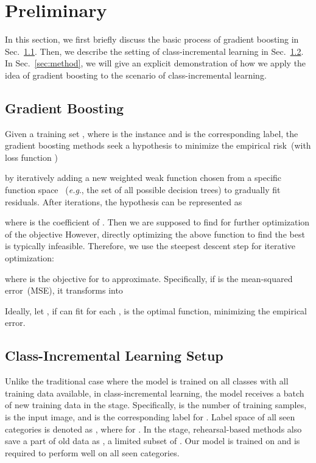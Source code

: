 \documentclass[runningheads]{llncs}
\begin{document}
\section{Preliminary}
In this section, we first briefly discuss the basic process of gradient boosting in Sec.~\ref{sec:GB}. Then, we describe the setting of class-incremental learning in Sec.~\ref{sec:setup}.  In Sec.~\ref{sec:method}, we will give an explicit demonstration of how we apply the idea of gradient boosting to the scenario of class-incremental learning.

\subsection{Gradient Boosting}\label{sec:GB}

Given a training set , where  is the instance and  is the corresponding label, the gradient boosting methods seek a hypothesis  to minimize the empirical risk~(with loss function )

by iteratively adding a new weighted weak function  chosen from a specific function space ~(\textit{e.g}., the set of all possible decision trees) to gradually fit residuals. After  iterations, the hypothesis  can be represented as 

where  is the coefficient of . Then we are supposed to find  for further optimization of the objective 
However, directly optimizing the above function to find the best  is typically infeasible. Therefore, we use the steepest descent step for iterative optimization:

where  is the objective for  to approximate. Specifically, if  is the mean-squared error~(MSE), it transforms into

Ideally, let , if  can fit  for each ,   is the optimal function, minimizing the empirical error.  
\subsection{Class-Incremental Learning Setup }\label{sec:setup}
Unlike the traditional case where the model is trained on all classes with all training data available, in class-incremental learning, the model receives a batch of new training data  in the  stage. Specifically,  is the number of training samples,  is the input image, and  is the corresponding label for . Label space of all seen categories is denoted as , where  for . In the  stage, rehearsal-based methods also save a part of old data as , a limited subset of . Our model is trained on  and is required to perform well on all seen categories. 
\end{document}
